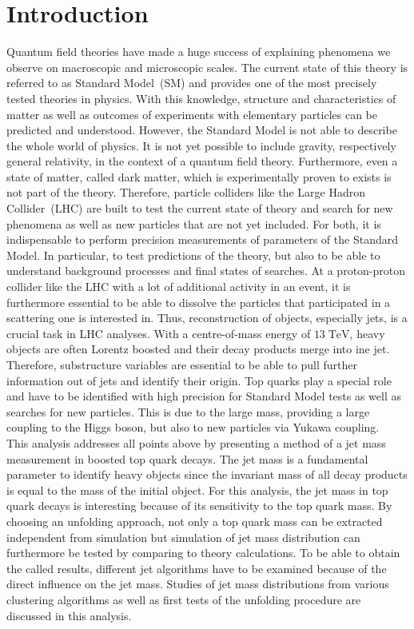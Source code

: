 \chapter{Introduction}
	Quantum field theories have made a huge success of explaining phenomena we observe on macroscopic and microscopic scales. The current state of this theory is referred to as Standard Model~(SM) and provides one of the most precisely tested theories in physics. With this knowledge, structure and characteristics of matter as well as outcomes of experiments with elementary particles can be predicted and understood. However, the Standard Model is not able to describe the whole world of physics. It is not yet possible to include gravity, respectively general relativity, in the context of a quantum field theory. Furthermore, even a state of matter, called dark matter, which is experimentally proven to exists is not part of the theory. Therefore, particle colliders like the Large Hadron Collider~(LHC) are built to test the current state of theory and search for new phenomena as well as new particles that are not yet included. For both, it is indispensable to perform precision measurements of parameters of the Standard Model. In particular, to test predictions of the theory, but also to be able to understand background processes and final states of searches. At a proton-proton collider like the LHC with a lot of additional activity in an event, it is furthermore essential to be able to dissolve the particles that participated in a scattering one is interested in. Thus, reconstruction of objects, especially jets, is a crucial task in LHC analyses. With a centre-of-mass energy of $13\;\text{TeV}$, heavy objects are often Lorentz boosted and their decay products merge into ine jet. Therefore, substructure variables are essential to be able to pull further information out of jets and identify their origin. Top quarks play a special role and have to be identified with high precision for Standard Model tests as well as searches for new particles. This is due to the large mass, providing a large coupling to the Higgs boson, but also to new particles via Yukawa coupling. \\	
	This analysis addresses all points above by presenting a method of a jet mass measurement in boosted top quark decays. The jet mass is a fundamental parameter to identify heavy objects since the invariant mass of all decay products is equal to the mass of the initial object. For this analysis, the jet mass in top quark decays is interesting because of its sensitivity to the top quark mass. By choosing an unfolding approach, not only a top quark mass can be extracted independent from simulation but simulation of jet mass distribution can furthermore be tested by comparing to theory calculations. To be able to obtain the called results, different jet algorithms have to be examined because of the direct influence on the jet mass. Studies of jet mass distributions from various clustering algorithms as well as first tests of the unfolding procedure are discussed in this analysis.
